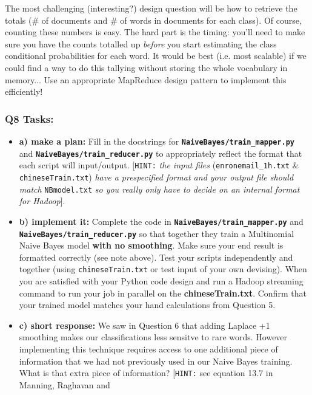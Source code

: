 \documentclass[11pt]{article}
\begin{document}
The most challenging (interesting?) design question will be how to
retrieve the totals (\# of documents and \# of words in documents for
each class). Of course, counting these numbers is easy. The hard part is
the timing: you'll need to make sure you have the counts totalled up
\emph{before} you start estimating the class conditional probabilities
for each word. It would be best (i.e. most scalable) if we could find a
way to do this tallying without storing the whole vocabulary in
memory... Use an appropriate MapReduce design pattern to implement this
efficiently!

\subsubsection{Q8 Tasks:}\label{q8-tasks}

\begin{itemize}
\item
  \textbf{a) make a plan:} Fill in the docstrings for
  \textbf{\texttt{NaiveBayes/train\_mapper.py}} and
  \textbf{\texttt{NaiveBayes/train\_reducer.py}} to appropriately
  reflect the format that each script will input/output.
  {[}\texttt{HINT:} \emph{the input files} (\texttt{enronemail\_1h.txt}
  \& \texttt{chineseTrain.txt}) \emph{have a prespecified format and
  your output file should match} \texttt{NBmodel.txt} \emph{so you
  really only have to decide on an internal format for Hadoop}{]}.
\item
  \textbf{b) implement it:} Complete the code in
  \textbf{\texttt{NaiveBayes/train\_mapper.py}} and
  \textbf{\texttt{NaiveBayes/train\_reducer.py}} so that together they
  train a Multinomial Naive Bayes model \textbf{with no smoothing}. Make
  sure your end result is formatted correctly (see note above). Test
  your scripts independently and together (using
  \texttt{chineseTrain.txt} or test input of your own devising). When
  you are satisfied with your Python code design and run a Hadoop
  streaming command to run your job in parallel on the
  \textbf{chineseTrain.txt}. Confirm that your trained model matches
  your hand calculations from Question 5.
\item
  \textbf{c) short response:} We saw in Question 6 that adding Laplace
  +1 smoothing makes our classifications less sensitve to rare words.
  However implementing this technique requires access to one additional
  piece of information that we had not previously used in our Naive
  Bayes training. What is that extra piece of information?
  {[}\texttt{HINT:} see equation 13.7 in Manning, Raghavan and

\end{itemize}
\end{document}
